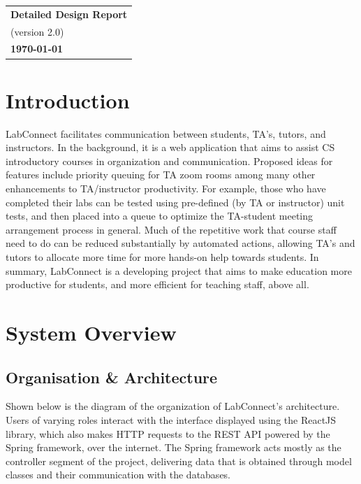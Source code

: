 \documentclass[a4paper, 12pt]{article}
\begin{document}
    \begin{table}[h!]
        \renewcommand{\arraystretch}{1.5}
        \centering
        \begin{tabular}{ |>{\centering\arraybackslash}m{15.15cm}| }
            \hline
            \Large \textbf{Detailed Design Report} \\
            \small (version 2.0) \\
            \small \textbf{\today} \\
            \hline
        \end{tabular}
    \end{table}
    
    
    \section{Introduction}
    
    LabConnect facilitates communication between students, TA's, tutors,
    and instructors. In the background, it is a web application
    that aims to assist CS introductory courses in organization and communication. 
    Proposed ideas for features include priority queuing for TA zoom rooms among many other 
    enhancements to TA/instructor productivity. For example, those who have completed their labs 
    can be tested using pre-defined (by TA or instructor) unit tests,  
    and then placed into a queue to optimize the TA-student meeting arrangement process in general. 
    Much of the repetitive work that course staff need to do can be reduced substantially by automated actions,
    allowing TA's and tutors to allocate more time for more hands-on help towards students.
    In summary, LabConnect is a developing project that aims to make education more productive for students,
    and more efficient for teaching staff, above all.
    
    \section{System Overview}
    
    \subsection{Organisation \& Architecture}
    
    Shown below is the diagram of the organization of LabConnect's architecture.
    Users of varying roles interact with the interface displayed using the ReactJS library, which also makes
    HTTP requests to the REST API powered by the Spring framework, over the internet.
    The Spring framework acts mostly as the controller segment of the project, delivering data
    that is obtained through model classes and their communication with the databases.
    
\end{document}
